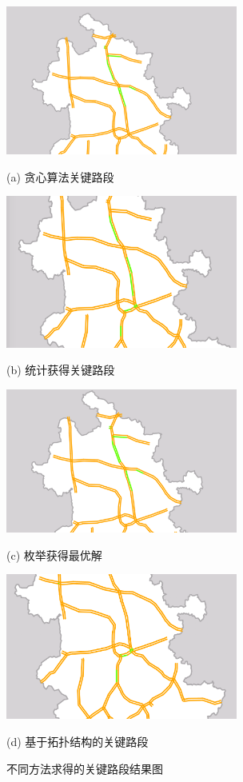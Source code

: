 				\begin{figure}[h]
				\begin{minipage}{0.48\linewidth}
				  \centerline{\includegraphics[width=3.0in]{picture/tanxin}}
				  \centerline{(a) 贪心算法关键路段}
				\end{minipage}
				\hfill
				\begin{minipage}{.48\linewidth}
				  \centerline{\includegraphics[width=3.0in]{picture/hotsection}}
				  \centerline{(b) 统计获得关键路段}
				\end{minipage}
				\vfill
				\begin{minipage}{0.48\linewidth}
				  \centerline{\includegraphics[width=3.0in]{picture/meiju}}
				  \centerline{(c) 枚举获得最优解}
				\end{minipage}
				\hfill
				\begin{minipage}{0.48\linewidth}
				  \centerline{\includegraphics[width=3.0in]{picture/degree}}
				  \centerline{(d) 基于拓扑结构的关键路段}
				\end{minipage}
				\caption{不同方法求得的关键路段结果图}
				\label{fig2}
				\end{figure}

